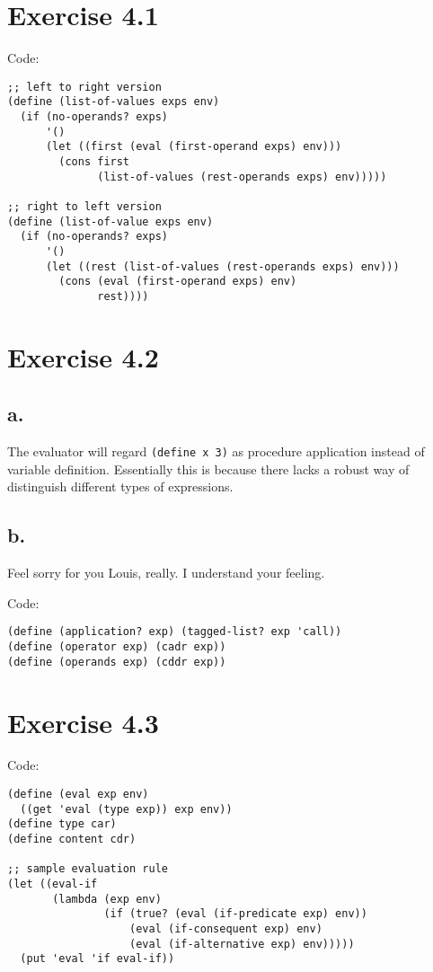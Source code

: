 \documentclass[../main.tex]{subfiles}
\begin{document}
\section{Exercise 4.1}

Code:

\begin{lstlisting}
;; left to right version
(define (list-of-values exps env)
  (if (no-operands? exps)
      '()
      (let ((first (eval (first-operand exps) env)))
        (cons first
              (list-of-values (rest-operands exps) env)))))

;; right to left version
(define (list-of-value exps env)
  (if (no-operands? exps)
      '()
      (let ((rest (list-of-values (rest-operands exps) env)))
        (cons (eval (first-operand exps) env)
              rest))))
\end{lstlisting}

\section{Exercise 4.2}

\subsection{a.}

The evaluator will regard \lstinline{(define x 3)} as procedure
application instead of variable definition. Essentially this is
because there lacks a robust way of distinguish different types
of expressions.

\subsection{b.}

Feel sorry for you Louis, really. I understand your feeling.

Code:

\begin{lstlisting}
(define (application? exp) (tagged-list? exp 'call))
(define (operator exp) (cadr exp))
(define (operands exp) (cddr exp))
\end{lstlisting}

\section{Exercise 4.3}

Code:

\begin{lstlisting}
(define (eval exp env)
  ((get 'eval (type exp)) exp env))
(define type car)
(define content cdr)

;; sample evaluation rule
(let ((eval-if
       (lambda (exp env)
               (if (true? (eval (if-predicate exp) env))
                   (eval (if-consequent exp) env)
                   (eval (if-alternative exp) env)))))
  (put 'eval 'if eval-if))                
\end{lstlisting}
\end{document}
